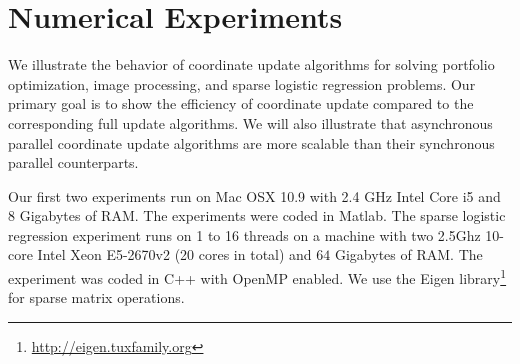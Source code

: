 \section{Numerical Experiments}\label{sec:numerical}
We illustrate the behavior of coordinate update algorithms for solving portfolio optimization, image processing, and sparse logistic regression problems. Our primary goal is to show the efficiency of coordinate update compared to the corresponding full update algorithms. We will also illustrate that asynchronous parallel coordinate update algorithms are more scalable than their synchronous parallel counterparts. 

Our first two experiments run on Mac OSX 10.9 with 2.4 GHz Intel Core i5 and 8 Gigabytes of RAM. The experiments were coded in Matlab. The sparse logistic regression experiment runs on 1 to 16 threads on a machine with two 2.5Ghz 10-core Intel Xeon E5-2670v2 (20 cores in total) and $64$ Gigabytes of RAM. The experiment was coded in C++ with OpenMP enabled. We use the Eigen library\footnote{\url{http://eigen.tuxfamily.org}} for sparse matrix operations.

